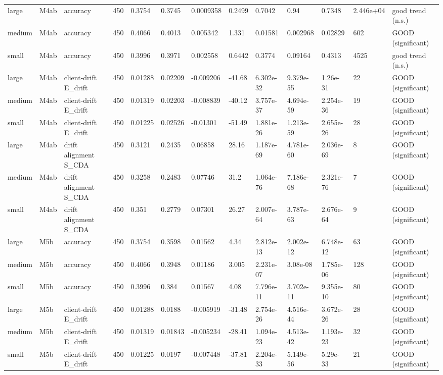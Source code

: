 \begin{table}[t]
\begin{tabular}{lllllllllllll}
large & M4ab & accuracy & 450 & 0.3754 & 0.3745 & 0.0009358 & 0.2499 & 0.7042 & 0.94 & 0.7348 & 2.446e+04 & good trend (n.s.) \\
medium & M4ab & accuracy & 450 & 0.4066 & 0.4013 & 0.005342 & 1.331 & 0.01581 & 0.002968 & 0.02829 & 602 & GOOD (significant) \\
small & M4ab & accuracy & 450 & 0.3996 & 0.3971 & 0.002558 & 0.6442 & 0.3774 & 0.09164 & 0.4313 & 4525 & good trend (n.s.) \\
large & M4ab & client-drift E\_drift & 450 & 0.01288 & 0.02209 & -0.009206 & -41.68 & 6.302e-32 & 9.379e-55 & 1.26e-31 & 22 & GOOD (significant) \\
medium & M4ab & client-drift E\_drift & 450 & 0.01319 & 0.02203 & -0.008839 & -40.12 & 3.757e-37 & 4.694e-59 & 2.254e-36 & 19 & GOOD (significant) \\
small & M4ab & client-drift E\_drift & 450 & 0.01225 & 0.02526 & -0.01301 & -51.49 & 1.881e-26 & 1.213e-59 & 2.655e-26 & 28 & GOOD (significant) \\
large & M4ab & drift alignment S\_CDA & 450 & 0.3121 & 0.2435 & 0.06858 & 28.16 & 1.187e-69 & 4.781e-60 & 2.036e-69 & 8 & GOOD (significant) \\
medium & M4ab & drift alignment S\_CDA & 450 & 0.3258 & 0.2483 & 0.07746 & 31.2 & 1.064e-76 & 7.186e-68 & 2.321e-76 & 7 & GOOD (significant) \\
small & M4ab & drift alignment S\_CDA & 450 & 0.351 & 0.2779 & 0.07301 & 26.27 & 2.007e-64 & 3.787e-63 & 2.676e-64 & 9 & GOOD (significant) \\
large & M5b & accuracy & 450 & 0.3754 & 0.3598 & 0.01562 & 4.34 & 2.812e-13 & 2.002e-12 & 6.748e-12 & 63 & GOOD (significant) \\
medium & M5b & accuracy & 450 & 0.4066 & 0.3948 & 0.01186 & 3.005 & 2.231e-07 & 3.08e-08 & 1.785e-06 & 128 & GOOD (significant) \\
small & M5b & accuracy & 450 & 0.3996 & 0.384 & 0.01567 & 4.08 & 7.796e-11 & 3.702e-11 & 9.355e-10 & 80 & GOOD (significant) \\
large & M5b & client-drift E\_drift & 450 & 0.01288 & 0.0188 & -0.005919 & -31.48 & 2.754e-26 & 4.516e-44 & 3.672e-26 & 28 & GOOD (significant) \\
medium & M5b & client-drift E\_drift & 450 & 0.01319 & 0.01843 & -0.005234 & -28.41 & 1.094e-23 & 4.513e-42 & 1.193e-23 & 32 & GOOD (significant) \\
small & M5b & client-drift E\_drift & 450 & 0.01225 & 0.0197 & -0.007448 & -37.81 & 2.204e-33 & 5.149e-56 & 5.29e-33 & 21 & GOOD (significant) \\

\end{tabular}
\end{table}
